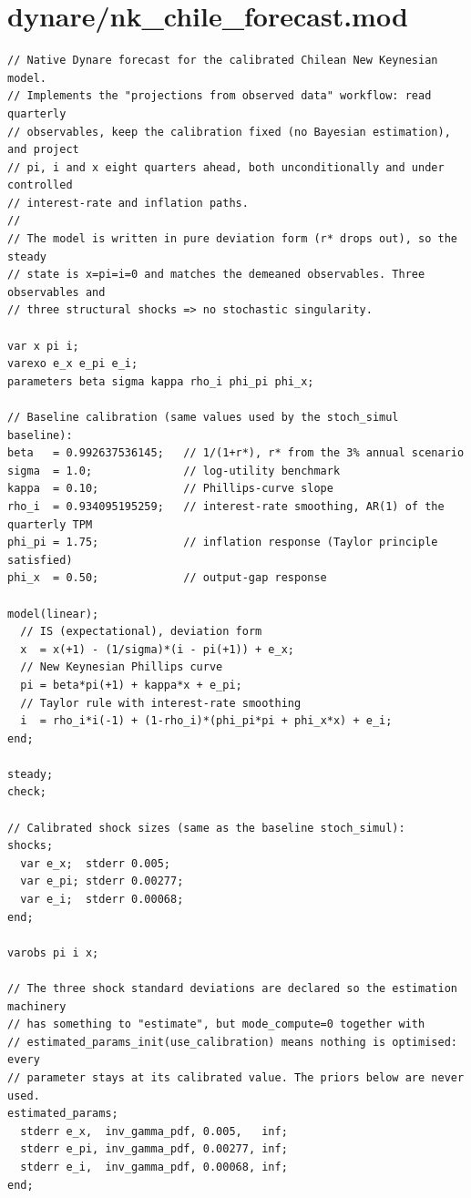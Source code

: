 \documentclass[9pt]{extarticle}
\begin{document}
\section{dynare/nk\_chile\_forecast.mod}
\begin{lstlisting}[language={}]
// Native Dynare forecast for the calibrated Chilean New Keynesian model.
// Implements the "projections from observed data" workflow: read quarterly
// observables, keep the calibration fixed (no Bayesian estimation), and project
// pi, i and x eight quarters ahead, both unconditionally and under controlled
// interest-rate and inflation paths.
//
// The model is written in pure deviation form (r* drops out), so the steady
// state is x=pi=i=0 and matches the demeaned observables. Three observables and
// three structural shocks => no stochastic singularity.

var x pi i;
varexo e_x e_pi e_i;
parameters beta sigma kappa rho_i phi_pi phi_x;

// Baseline calibration (same values used by the stoch_simul baseline):
beta   = 0.992637536145;   // 1/(1+r*), r* from the 3% annual scenario
sigma  = 1.0;              // log-utility benchmark
kappa  = 0.10;             // Phillips-curve slope
rho_i  = 0.934095195259;   // interest-rate smoothing, AR(1) of the quarterly TPM
phi_pi = 1.75;             // inflation response (Taylor principle satisfied)
phi_x  = 0.50;             // output-gap response

model(linear);
  // IS (expectational), deviation form
  x  = x(+1) - (1/sigma)*(i - pi(+1)) + e_x;
  // New Keynesian Phillips curve
  pi = beta*pi(+1) + kappa*x + e_pi;
  // Taylor rule with interest-rate smoothing
  i  = rho_i*i(-1) + (1-rho_i)*(phi_pi*pi + phi_x*x) + e_i;
end;

steady;
check;

// Calibrated shock sizes (same as the baseline stoch_simul):
shocks;
  var e_x;  stderr 0.005;
  var e_pi; stderr 0.00277;
  var e_i;  stderr 0.00068;
end;

varobs pi i x;

// The three shock standard deviations are declared so the estimation machinery
// has something to "estimate", but mode_compute=0 together with
// estimated_params_init(use_calibration) means nothing is optimised: every
// parameter stays at its calibrated value. The priors below are never used.
estimated_params;
  stderr e_x,  inv_gamma_pdf, 0.005,   inf;
  stderr e_pi, inv_gamma_pdf, 0.00277, inf;
  stderr e_i,  inv_gamma_pdf, 0.00068, inf;
end;


\end{lstlisting}
\end{document}
